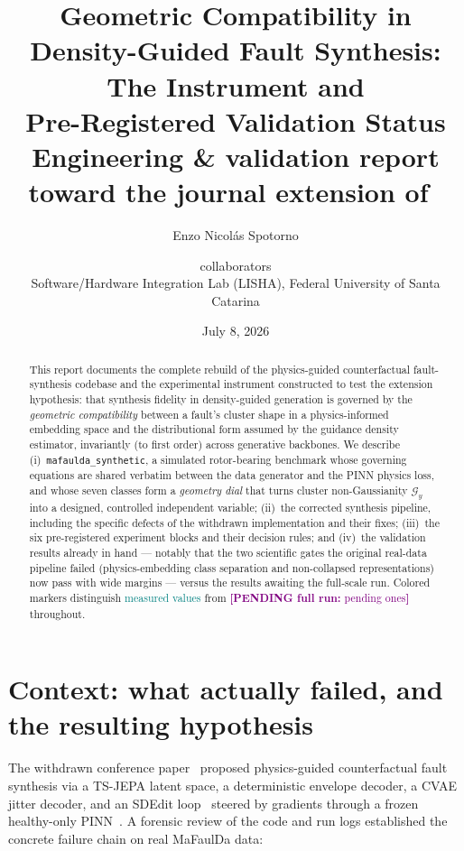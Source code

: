 \documentclass[11pt]{article}
\title{\textbf{Geometric Compatibility in Density-Guided Fault Synthesis:\\
The \code{mafaulda\_synthetic} Instrument and\\ Pre-Registered Validation Status}\\[4pt]
\large Engineering \& validation report toward the journal extension of~\cite{spotorno2026synthesis}}
\author{Enzo Nicol\'as Spotorno \and collaborators\\
\small Software/Hardware Integration Lab (LISHA), Federal University of Santa Catarina}
\date{July 8, 2026}
\newcommand{\Gng}{\mathcal{G}}
\newcommand{\pending}[1]{\textcolor{purple}{\textbf{[PENDING full run:} #1\textbf{]}}}
\newcommand{\measured}[1]{\textcolor{teal}{#1}}
\newcommand{\code}[1]{\texttt{\small #1}}
\begin{document}
\maketitle

\begin{abstract}
\noindent
This report documents the complete rebuild of the physics-guided
counterfactual fault-synthesis codebase and the experimental instrument
constructed to test the extension hypothesis: that synthesis fidelity in
density-guided generation is governed by the \emph{geometric compatibility}
between a fault's cluster shape in a physics-informed embedding space and the
distributional form assumed by the guidance density estimator, invariantly
(to first order) across generative backbones. We describe
(i)~\code{mafaulda\_synthetic}, a simulated rotor-bearing benchmark whose
governing equations are shared verbatim between the data generator and the
PINN physics loss, and whose seven classes form a \emph{geometry dial} that
turns cluster non-Gaussianity $\Gng_y$ into a designed, controlled
independent variable; (ii)~the corrected synthesis pipeline, including the
specific defects of the withdrawn implementation and their fixes;
(iii)~the six pre-registered experiment blocks and their decision rules; and
(iv)~the validation results already in hand --- notably that the two
scientific gates the original real-data pipeline failed (physics-embedding
class separation and non-collapsed representations) now pass with wide
margins --- versus the results awaiting the full-scale run. Colored markers
distinguish \measured{measured values} from \pending{pending ones}
throughout.
\end{abstract}

\section{Context: what actually failed, and the resulting hypothesis}
\label{sec:context}

The withdrawn conference paper~\cite{spotorno2026synthesis} proposed
physics-guided counterfactual fault synthesis via a TS-JEPA latent space, a
deterministic envelope decoder, a CVAE jitter decoder, and an SDEdit
loop~\cite{meng2022sdedit} steered by gradients through a frozen healthy-only
PINN~\cite{spotorno2026linking}. A forensic review of the code and run logs
established the concrete failure chain on real MaFaulDa data:
\end{document}
